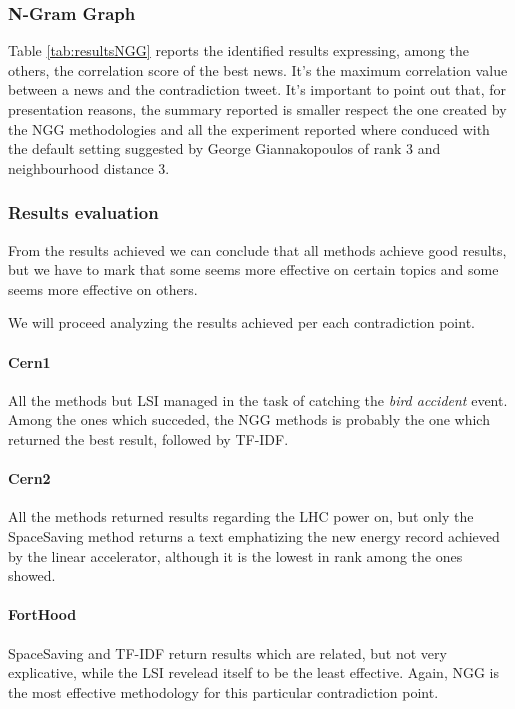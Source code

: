 \subsubsection*{N-Gram Graph}
Table \ref{tab:resultsNGG} reports the identified results expressing, among the others, the correlation score of the best news. It's the maximum correlation value between a news and the contradiction tweet.
It's important to point out that, for presentation reasons, the summary reported is smaller respect the one created by the NGG methodologies and all the experiment reported where conduced with the default setting suggested by George Giannakopoulos of rank 3 and neighbourhood distance 3.









\subsubsection*{Results evaluation}
From the results achieved we can conclude that all methods achieve good results,
but we have to mark that some seems more effective on certain topics and some
seems more effective on others.

We will proceed analyzing the results achieved per each contradiction point.

\paragraph*{Cern1}
All the methods but LSI managed in the task of catching the \emph{bird accident}
event. Among the ones which succeded, the NGG methods is probably the one which
returned the best result, followed by TF-IDF.

\paragraph*{Cern2}
All the methods returned results regarding the LHC power on, but only the
SpaceSaving method returns a text emphatizing the new energy record achieved by the
linear accelerator, although it is the lowest in rank among the ones showed.

\paragraph*{FortHood}
SpaceSaving and TF-IDF return results which are related, but not very
explicative, while the LSI revelead itself to be the least effective. Again, NGG
is the most effective methodology for this particular contradiction point.

